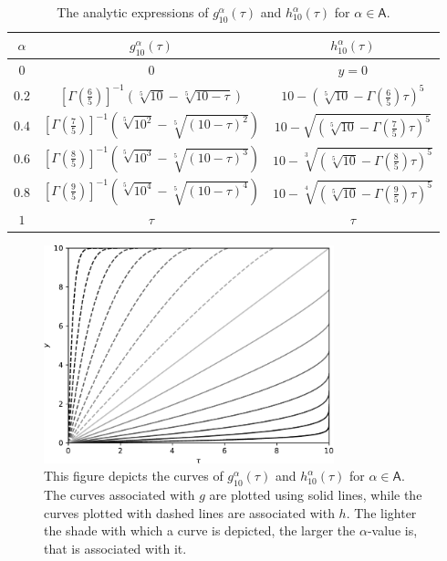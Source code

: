 \documentclass{article}
\theoremstyle{theorem}
\theoremstyle{definition}
\begin{document}
\begin{table}[h!]
 \centering
 \caption{The analytic expressions of $g_{10}^{\alpha}(\tau)$ and $h_{10}^{\alpha}(\tau)$ for $\alpha\in\mathsf{A}$.}
 \label{tab:gandh}
 \begin{tabular}{|c || c | c|} 
 \hline
 $\alpha$ & $g_{10}^{\alpha}(\tau)$ & $h_{10}^{\alpha}(\tau)$ \\ [0.5ex] 
 \hline\hline
 $0$ & 0 & $y=0$ \\ 
 $0.2$ & $[\Gamma\left (\frac{6}{5} \right )]^{-1}\left(\sqrt[5]{10}-\sqrt[5]{10-\tau}\right)$ & $10 - \left ( \sqrt[5]{10} -  \Gamma\left (\frac{6}{5} \right ) \tau \right )^5$  \\
 $0.4$ & $[\Gamma\left (\frac{7}{5} \right )]^{-1}\left(\sqrt[5]{10^2}-\sqrt[5]{(10-\tau)^2}\right)$ & $10 - \sqrt{\left ( \sqrt[5]{10} -  \Gamma\left (\frac{7}{5} \right ) \tau \right )^5}$ \\
 $0.6$ & $[\Gamma\left (\frac{8}{5} \right )]^{-1}\left(\sqrt[5]{10^3}-\sqrt[5]{(10-\tau)^3}\right)$ & $10 - \sqrt[3]{\left ( \sqrt[5]{10} -  \Gamma\left (\frac{8}{5} \right ) \tau \right )^5}$ \\
 $0.8$ & $[\Gamma\left (\frac{9}{5} \right )]^{-1}\left(\sqrt[5]{10^4}-\sqrt[5]{(10-\tau)^4}\right)$ & $10 - \sqrt[4]{\left ( \sqrt[5]{10} -  \Gamma\left (\frac{9}{5} \right ) \tau \right )^5}$ \\ [1ex] 
 $1$ & $\tau$ & $\tau$ \\ [1ex] 
 \hline
 \end{tabular}
 \end{table}

\begin{figure}[htb]
\centering
\includegraphics[width=0.75\textwidth]{gh.pdf}
\caption{This figure depicts the curves of $g_{10}^{\alpha}(\tau)$ and $h_{10}^{\alpha}(\tau)$ for $\alpha\in\mathsf{A}$. The curves associated with $g$ are plotted using 
solid lines, while the curves plotted with dashed lines are associated with $h$. The lighter the shade with which a curve is depicted, the larger the $\alpha$-value is, that is associated with it.
}
\label{fig:gandh}
\end{figure}
\end{document}
